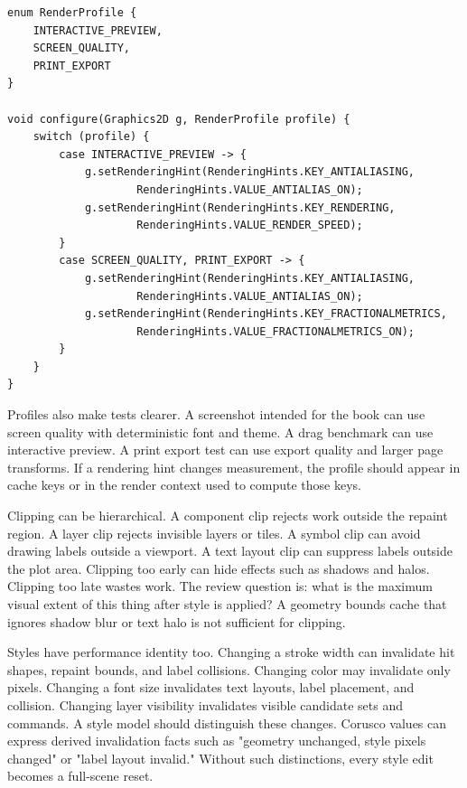 \begin{lstlisting}[caption={Rendering profiles make hint policy explicit.}]
enum RenderProfile {
    INTERACTIVE_PREVIEW,
    SCREEN_QUALITY,
    PRINT_EXPORT
}

void configure(Graphics2D g, RenderProfile profile) {
    switch (profile) {
        case INTERACTIVE_PREVIEW -> {
            g.setRenderingHint(RenderingHints.KEY_ANTIALIASING,
                    RenderingHints.VALUE_ANTIALIAS_ON);
            g.setRenderingHint(RenderingHints.KEY_RENDERING,
                    RenderingHints.VALUE_RENDER_SPEED);
        }
        case SCREEN_QUALITY, PRINT_EXPORT -> {
            g.setRenderingHint(RenderingHints.KEY_ANTIALIASING,
                    RenderingHints.VALUE_ANTIALIAS_ON);
            g.setRenderingHint(RenderingHints.KEY_FRACTIONALMETRICS,
                    RenderingHints.VALUE_FRACTIONALMETRICS_ON);
        }
    }
}
\end{lstlisting}

Profiles also make tests clearer. A screenshot intended for the book can use screen quality with deterministic font and theme. A drag benchmark can use interactive preview. A print export test can use export quality and larger page transforms. If a rendering hint changes measurement, the profile should appear in cache keys or in the render context used to compute those keys.

Clipping can be hierarchical. A component clip rejects work outside the repaint region. A layer clip rejects invisible layers or tiles. A symbol clip can avoid drawing labels outside a viewport. A text layout clip can suppress labels outside the plot area. Clipping too early can hide effects such as shadows and halos. Clipping too late wastes work. The review question is: what is the maximum visual extent of this thing after style is applied? A geometry bounds cache that ignores shadow blur or text halo is not sufficient for clipping.

Styles have performance identity too. Changing a stroke width can invalidate hit shapes, repaint bounds, and label collisions. Changing color may invalidate only pixels. Changing a font size invalidates text layouts, label placement, and collision. Changing layer visibility invalidates visible candidate sets and commands. A style model should distinguish these changes. Corusco values can express derived invalidation facts such as "geometry unchanged, style pixels changed" or "label layout invalid." Without such distinctions, every style edit becomes a full-scene reset.


